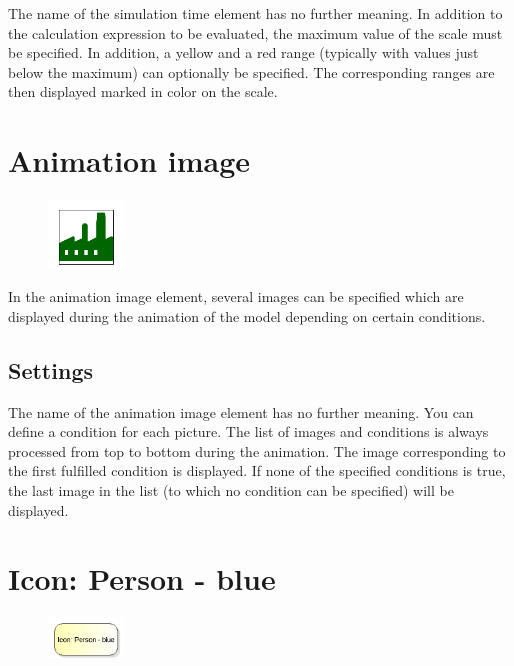 The name of the simulation time element has no further meaning.
In addition to the calculation expression to be evaluated,
the maximum value of the scale must be specified. In addition,
a yellow and a red range (typically with values just below
the maximum) can optionally be specified. The corresponding
ranges are then displayed marked in color on the scale.


\section{Animation image}
\label{ref:ModelElementAnimationImage}

\begin{figure}
\vspace{-22pt}
\includegraphics[width=2cm]{imageModelElementAnimationImage.png}
\vspace{-22pt}
\end{figure}

In the animation image element, several images can be specified
which are displayed during the animation of the model
depending on certain conditions.

\subsection*{Settings}

The name of the animation image element has no further meaning.
You can define a condition for each picture. The list of images and conditions
is always processed from top to bottom during the animation.
The image corresponding to the first fulfilled condition is displayed.
If none of the specified conditions is true, the last image in the list
(to which no condition can be specified) will be displayed.


\section{Icon: Person - blue}
\label{ref:ModelElementClientIcon}

\begin{figure}
\vspace{-22pt}
\includegraphics[width=2cm]{imageModelElementClientIcon.png}
\vspace{-22pt}
\end{figure}

